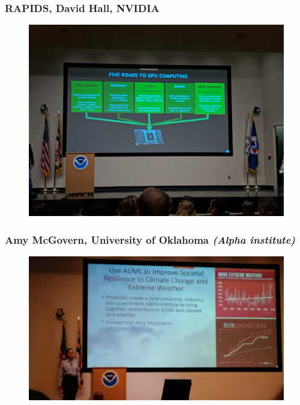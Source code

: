 \documentclass{beamer}
\begin{document}
\begin{frame}
\frametitle{RAPIDS, David Hall, NVIDIA}
\begin{figure}
	\includegraphics[width=\linewidth]{figs/IMG_20190423_124704.jpg}
\end{figure}
\end{frame}

\begin{frame}
\frametitle{Amy McGovern, University of Oklahoma \textit{(Alpha institute)}}
\begin{figure}
	\includegraphics[width=\linewidth]{figs/P_20190425_105024.jpg}
\end{figure}
\end{frame}
\end{document}
